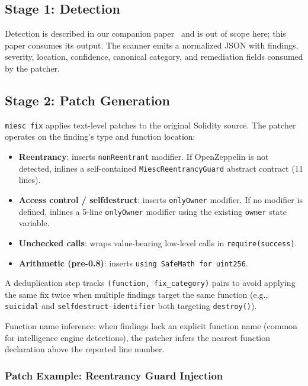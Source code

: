 \documentclass[conference]{IEEEtran}
\begin{document}
\subsection{Stage 1: Detection}

Detection is described in our companion paper~\cite{boiero2025miesc} and is out of scope here; this paper consumes its output. The scanner emits a normalized JSON with findings, severity, location, confidence, canonical category, and remediation fields consumed by the patcher.

\subsection{Stage 2: Patch Generation}

\texttt{miesc fix} applies text-level patches to the original Solidity source. The patcher operates on the finding's type and function location:

\begin{itemize}
    \item \textbf{Reentrancy}: inserts \texttt{nonReentrant} modifier. If OpenZeppelin is not detected, inlines a self-contained \texttt{MiescReentrancyGuard} abstract contract (11 lines).
    \item \textbf{Access control / selfdestruct}: inserts \texttt{onlyOwner} modifier. If no modifier is defined, inlines a 5-line \texttt{onlyOwner} modifier using the existing \texttt{owner} state variable.
    \item \textbf{Unchecked calls}: wraps value-bearing low-level calls in \texttt{require(success)}.
    \item \textbf{Arithmetic (pre-0.8)}: inserts \texttt{using SafeMath for uint256}.
\end{itemize}

A deduplication step tracks \texttt{(function, fix\_category)} pairs to avoid applying the same fix twice when multiple findings target the same function (e.g., \texttt{suicidal} and \texttt{selfdestruct-identifier} both targeting \texttt{destroy()}).

Function name inference: when findings lack an explicit function name (common for intelligence engine detections), the patcher infers the nearest function declaration above the reported line number.

\subsubsection{Patch Example: Reentrancy Guard Injection}
\end{document}
